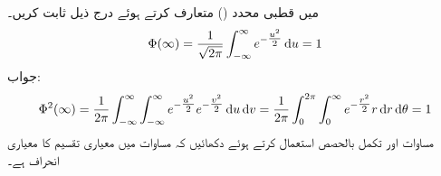 \quad
{} میں قطبی محدد () متعارف کرتے ہوئے درج ذیل ثابت کریں۔
\begin{align}\label{مساوات_شماریات_سوال_مساوات}
\Phi(\infty)=\frac{1}{\sqrt{2\pi}}\int_{-\infty}^{\infty} e^{-\tfrac{u^2}{2}}\dif u=1
\end{align}
جواب:\quad
\begin{align*}
\Phi^2(\infty)=\frac{1}{2\pi}\int_{-\infty}^{\infty}\int_{-\infty}^{\infty}e^{-\tfrac{u^2}{2}}e^{-\tfrac{v^2}{2}}\dif u\dif v=\frac{1}{2\pi}\int_{0}^{2\pi}\int_{0}^{\infty} e^{-\tfrac{r^2}{2}}r\dif r \dif \theta=1
\end{align*}
\quad
مساوات  اور تکمل بالحصص استعمال کرتے ہوئے دکھائیں کہ مساوات  میں  معیاری تقسیم کا  معیاری انحراف ہے۔


